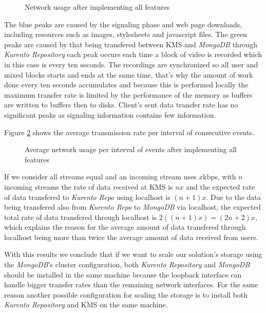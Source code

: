 \begin{figure}[!htb]
  \begin{center}
    
  \end{center}
  \caption{Network usage after implementing all features}
  \label{fig:test_full_features_net}
\end{figure}

      The blue peaks are caused by the signaling phase and web page downloads, including resources such as images, stylesheets and javascript files. 
      The green peaks are caused by that being transfered between \ac{KMS} and \emph{MongoDB} through \emph{Kurento Repository} each peak occurs each time a block of video is recorded which in this case is every ten seconds. 
      The recordings are synchronized so all user and mixed blocks starts and ends at the same time, that's why the amount of work done every ten seconds accumulates and because this is performed locally the maximum transfer rate is limited by the performance of the memory as buffers are written to buffers then to disks. 
      Client's sent data transfer rate has no significant peaks as signaling information contains few information.

      Figure \ref{fig:summary_full_net} shows the average transmission rate per interval of consecutive events. 

\begin{figure}[!htb]
  \begin{center}
    
  \end{center}
  \caption{Average network usage per interval of events after implementing all features}
  \label{fig:summary_full_net}
\end{figure}

If we consider all streams equal and an incoming stream uses $x$kbps, with $n$ incoming streams the rate of data received at \ac{KMS} is $nx$ and the expected rate of data transfered to \emph{Kurento Repo} using localhost is $(n+1)x$. Due to the data being transfered also from \emph{Kurento Repo} to \emph{MongoDB} via localhost, the expected total rate of data transfered through localhost is $2((n+1)x) = (2n+2)x$, which explains the reason for the average amount of data transfered through localhost being more than twice the average amount of data received from users.

With this results we conclude that if we want to scale our solution's storage using the \emph{MongoDB}'s cluster configuration, both \emph{Kurento Repository} and \emph{MongoDB} should be installed in the same machine because the loopback interface can handle bigger transfer rates than the remaining network interfaces. For the same reason another possible configuration for scaling the storage is to install both \emph{Kurento Repository} and \ac{KMS} on the same machine.

